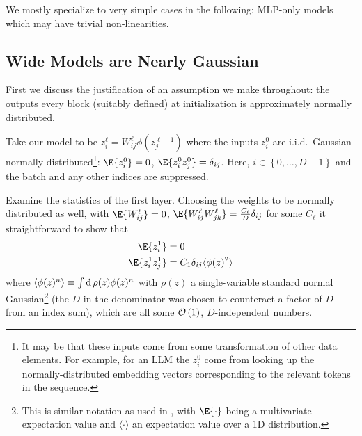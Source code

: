 We mostly specialize to very simple cases in the following: MLP-only models which may have trivial
non-linearities.


\subsection{Wide Models are Nearly Gaussian \label{app_nearly_gaussian_wide_models}}

First we discuss the justification of an assumption we make throughout: the outputs every block
(suitably defined) at initialization is approximately normally distributed.

Take our model to be $ z ^{ \ell } _{ i } = W ^{  \ell }_{ ij } \phi \left ( z ^{ \ell -1 } _{ j }
\right ) $ where the inputs $ z ^{ 0 } _{ i } $ are i.i.d.~Gaussian-normally
distributed\footnote{It may be that these inputs come from some transformation of other data
    elements. For example, for an LLM the $ z ^{ 0 }_{ i } $ come from looking up the
    normally-distributed embedding vectors corresponding to the relevant tokens in the
sequence.}: $ \E{ z^{ 0 }_{ i }} = 0 $,  $ \E{ z ^{ 0 }_{ i }z ^{ 0 }_{ j }}
=  \delta _{ ij } $. Here, $ i \in \left \{ 0, \ldots , D-1 \right \} $ and the batch and any
other indices are suppressed.

Examine the statistics of the first layer. Choosing the weights to be normally distributed as well,
with $ \E{ W^{ \ell }_{ ij }} = 0 $,  $ \E{ W ^{ \ell }_{ ij }W ^{ \ell }_{ jk
}} = \frac{ C _{ \ell } }{ D } \delta _{ ij }$ for some $ C _{  \ell } $ it straightforward to
show that
\begin{align}
    \E{ z^{ 1 }_{ i }} &= 0 \nn
    \E{ z^{ 1 }_{ i }z^{ 1 }_{ j }} &= C _{ 1 }\delta _{ ij } \langle \phi(z )^{ 2 }\rangle
\end{align}
where  $ \langle \phi(z)^{ n }\rangle \equiv  \int  {\rm d}\, \rho(z) \phi(z)^{ n } $ with
$ \rho(z) $ a single-variable standard normal Gaussian\footnote{This is similar notation as used in
\cite{physicalDL}, with $ \E{\cdot} $ being a multivariate expectation value and $ \langle \cdot
\rangle  $ an expectation value over a 1D distribution.} (the $ D $ in the denominator was chosen to
counteract a factor of $ D $ from an index sum), which are all some $ \mathcal{O} \left( 1 \right)  $, $ D
$-independent numbers. 

